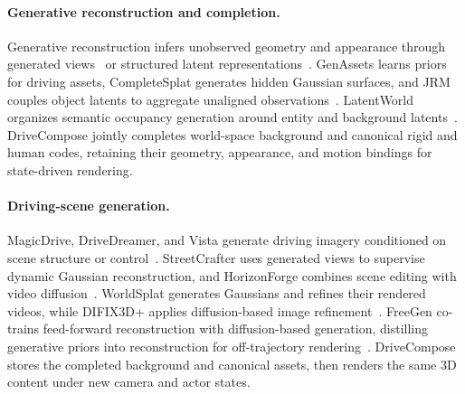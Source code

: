 \paragraph{Generative reconstruction and completion.}
Generative reconstruction infers unobserved geometry and appearance through generated views~\cite{liu2023zero123,shi2024mvdream,gao2024cat3d} or structured latent representations~\cite{xiang2025trellis,xiang2026trellis2}. GenAssets learns priors for driving assets, CompleteSplat generates hidden Gaussian surfaces, and JRM couples object latents to aggregate unaligned observations~\cite{yang2025genassets,liao2025complete,wu2026jrm}. LatentWorld organizes semantic occupancy generation around entity and background latents~\cite{park2026latentworld}. DriveCompose jointly completes world-space background and canonical rigid and human codes, retaining their geometry, appearance, and motion bindings for state-driven rendering.

\paragraph{Driving-scene generation.}
MagicDrive, DriveDreamer, and Vista generate driving imagery conditioned on scene structure or control~\cite{gao2024magicdrive,wang2024drivedreamer,gao2024vista}. StreetCrafter uses generated views to supervise dynamic Gaussian reconstruction, and HorizonForge combines scene editing with video diffusion~\cite{streetcrafter,wang2026horizonforge}. WorldSplat generates Gaussians and refines their rendered videos, while DIFIX3D+ applies diffusion-based image refinement~\cite{zhu2025worldsplat,wu2025difix3d}. FreeGen co-trains feed-forward reconstruction with diffusion-based generation, distilling generative priors into reconstruction for off-trajectory rendering~\cite{chen2026freegen}. DriveCompose stores the completed background and canonical assets, then renders the same 3D content under new camera and actor states.
